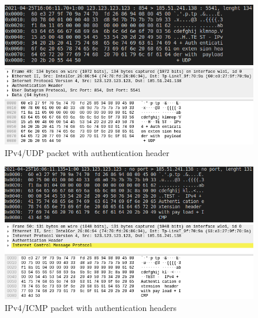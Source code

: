 \documentclass[a4paper,12pt]{article}
\begin{document}
\begin{figure}[H]
            \vfill
            
            \begin{center}

            \includegraphics[width=\linewidth]{cmp2ipk.png}
            
            \vspace{0.5cm}
            
            \includegraphics[width=\linewidth]{cmp2wireshark.png}
            \caption{IPv4/UDP packet with authentication header}
            \end{center}
            
            \vfill
\end{figure}

\begin{figure}[H]
            \includegraphics[width=\linewidth]{cmp3ipk.png}
            
            \includegraphics[width=\linewidth]{cmp3wireshark.png}
            \caption{IPv4/ICMP packet with authentication headers}
\end{figure}
\end{document}
